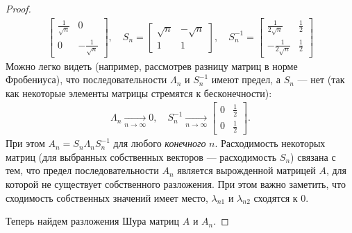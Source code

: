 \documentclass{article}
\newtheorem*{proof}{$\square$}
\begin{document}
\begin{proof}
\begin{equation*}
\begin{aligned}
\begin{bmatrix}
					\frac{1}{\sqrt{n}} & 0 \\ 0 & -\frac{1}{\sqrt{n}}
				\end{bmatrix},\quad
				S_n = \begin{bmatrix}
					\sqrt{n} & -\sqrt{n}\\1 & 1
				\end{bmatrix},\quad 
				S_n^{-1} = \begin{bmatrix}
					\frac{1}{2\sqrt{n}} & \frac{1}{2}\\ -\frac{1}{2\sqrt{n}} & \frac{1}{2}
				\end{bmatrix}
		\end{aligned}\end{equation*}
		Можно легко видеть (например, рассмотрев разницу матриц в норме Фробениуса), что последовательности $\Lambda_n$ и $S_n^{-1}$ имеют предел, а $S_n$ --- нет (так как некоторые элементы матрицы стремятся к бесконечности):
		\begin{equation*}\begin{aligned}
				\Lambda_n\xrightarrow[n\to\infty]{} 0,\quad
				S_n^{-1} \xrightarrow[n\to\infty]{}
				\begin{bmatrix}
					0 & \frac{1}{2}\\ 0 & \frac{1}{2}
				\end{bmatrix}.
		\end{aligned}\end{equation*}
		При этом $A_n = S_n \Lambda_n S_n^{-1}$ для любого \textit{конечного} $n$. Расходимость некоторых матриц (для выбранных собственных векторов --- расходимость $S_n$) связана с тем, что предел последовательности $A_n$ является вырожденной матрицей $A$, для которой не существует собственного разложения. При этом важно заметить, что сходимость собственных значений имеет место, $\lambda_{n1}$ и $\lambda_{n2}$ сходятся к 0.
		
		Теперь найдем разложения Шура матриц $A$ и $A_n$. 
		

\end{proof}
\end{document}
